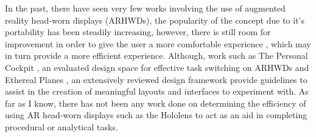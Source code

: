 In the past, there have seen very few works involving the use of augmented reality head-worn displays (ARHWDs), the popularity of the concept due to it's portability has been steadily increasing, however, there is still room for improvement in order to give the user a more comfortable experience \cite{Velamkayala2017}, which may in turn provide a more efficient experience. Although, work such as The Personal Cockpit \cite{Ens2014}, an evaluated design space for effective task switching on ARHWDs and Ethereal Planes \cite{Ens2014a}, an extensively reviewed design framework provide guidelines to assist in the creation of meaningful layouts and interfaces to experiment with. As far as I know, there has not been any work done on determining the efficiency of using AR head-worn displays such as the Hololens to act as an aid in completing procedural or analytical tasks. 

